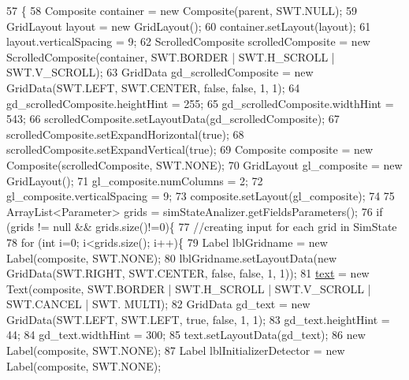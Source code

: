 \begin{DoxyCode}
57                                                 \{
58         Composite container = \textcolor{keyword}{new} Composite(parent, SWT.NULL);
59         GridLayout layout = \textcolor{keyword}{new} GridLayout();
60         container.setLayout(layout);
61         layout.verticalSpacing = 9;     
62         ScrolledComposite scrolledComposite = \textcolor{keyword}{new} ScrolledComposite(container, SWT.BORDER | SWT.H\_SCROLL | 
      SWT.V\_SCROLL);
63         GridData gd\_scrolledComposite = \textcolor{keyword}{new} GridData(SWT.LEFT, SWT.CENTER, \textcolor{keyword}{false}, \textcolor{keyword}{false}, 1, 1);
64         gd\_scrolledComposite.heightHint = 255;
65         gd\_scrolledComposite.widthHint = 543;
66         scrolledComposite.setLayoutData(gd\_scrolledComposite);
67         scrolledComposite.setExpandHorizontal(\textcolor{keyword}{true});
68         scrolledComposite.setExpandVertical(\textcolor{keyword}{true});      
69         Composite composite = \textcolor{keyword}{new} Composite(scrolledComposite, SWT.NONE);
70         GridLayout gl\_composite = \textcolor{keyword}{new} GridLayout();
71         gl\_composite.numColumns = 2;
72         gl\_composite.verticalSpacing = 9;
73         composite.setLayout(gl\_composite);
74         
75         ArrayList<Parameter> grids = simStateAnalizer.getFieldsParameters();    
76         \textcolor{keywordflow}{if} (grids != null && grids.size()!=0)\{
77             \textcolor{comment}{//creating input for each grid in SimState}
78             \textcolor{keywordflow}{for} (\textcolor{keywordtype}{int} i=0; i<grids.size(); i++)\{         
79                 Label lblGridname = \textcolor{keyword}{new} Label(composite, SWT.NONE);
80                 lblGridname.setLayoutData(\textcolor{keyword}{new} GridData(SWT.RIGHT, SWT.CENTER, \textcolor{keyword}{false}, \textcolor{keyword}{false}, 1, 1));
81                 \hyperlink{classit_1_1isislab_1_1masonhelperdocumentation_1_1mason_1_1wizards_1_1_g___grids_cell_page_aaccd7bc0434484906b1e388bd6b5a1cc}{text} = \textcolor{keyword}{new} Text(composite, SWT.BORDER | SWT.H\_SCROLL | SWT.V\_SCROLL | SWT.CANCEL | SWT.
      MULTI);
82                 GridData gd\_text = \textcolor{keyword}{new} GridData(SWT.LEFT, SWT.LEFT, \textcolor{keyword}{true}, \textcolor{keyword}{false}, 1, 1);
83                 gd\_text.heightHint = 44;
84                 gd\_text.widthHint = 300;
85                 text.setLayoutData(gd\_text);
86                 \textcolor{keyword}{new} Label(composite, SWT.NONE);         
87                 Label lblInitializerDetector = \textcolor{keyword}{new} Label(composite, SWT.NONE);

\end{DoxyCode}
